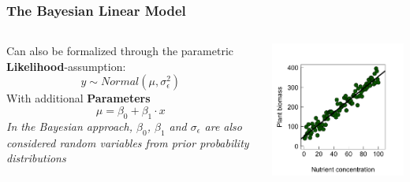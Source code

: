 \documentclass{beamer}
\begin{document}
\begin{frame}
    \frametitle{The Bayesian Linear Model}
    \begin{columns}
        \begin{column}{0.4\textwidth}
            Can also be formalized through the parametric
            \textbf{Likelihood}-assumption:
            \[
            y \sim Normal(\mu, \sigma_\epsilon^2)
            \]
            With additional \textbf{Parameters}
            \[
            \mu = \beta_0 + \beta_1 \cdot x
            \]
            \textit{In the Bayesian approach, $\beta_0$, $\beta_1$ and $\sigma_\epsilon$ are also considered random variables from prior probability distributions}
        \end{column}
        \begin{column}{0.6\textwidth}
            \includegraphics[width=\textwidth]{lectures/day_11_bayesian_lm/figures/unnamed-chunk-4-1.png}
        \end{column}
    \end{columns}
\end{frame}
\end{document}
